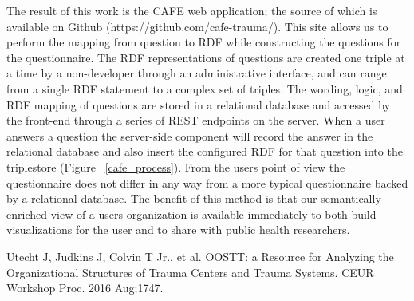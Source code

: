 \documentclass{amia}
\begin{document}
The result of this work is the CAFE web application; the source of which is available on Github (https://github.com/cafe-trauma/). 
This site allows us to perform the mapping from question to RDF while constructing the questions for the questionnaire.
The RDF representations of questions are created one triple at a time by a non-developer through an administrative interface, and can range from a single RDF statement to a complex set of triples.
The wording, logic, and RDF mapping of questions are stored in a relational database and accessed by the front-end through a series of REST endpoints on the server.
When a user answers a question the server-side component will record the answer in the relational database and also insert the configured RDF for that question into the triplestore (Figure ~\ref{cafe_process}).
From the users point of view the questionnaire does not differ in any way from a more typical questionnaire backed by a relational database.
The benefit of this method is that our semantically enriched view of a users organization is available immediately to both build visualizations for the user and to share with public health researchers.

\makeatletter
\renewcommand{\@biblabel}[1]{\hfill #1.}
\makeatother



\begin{thebibliography}{1}
\setlength\itemsep{-0.1em}

Utecht J, Judkins J, Colvin T Jr., et al. OOSTT: a Resource for Analyzing the Organizational Structures of Trauma Centers and Trauma Systems. CEUR Workshop Proc. 2016 Aug;1747.

\end{thebibliography}
\end{document}
